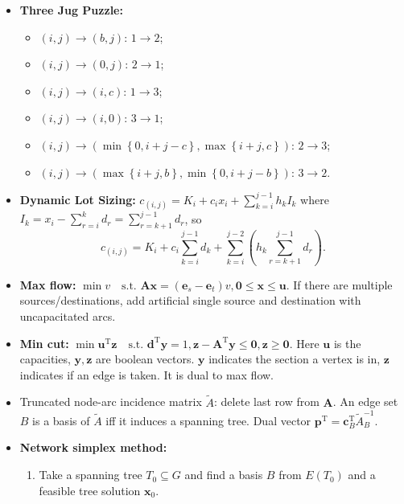 \documentclass[10pt]{article}
\begin{document}
\begin{multicols*}{3}
\begin{itemize}
            \item \textbf{Three Jug Puzzle: }
            \begin{itemize}
                \item $(i, j) \to (b, j)$: $1 \to 2$;
                \item $(i, j) \to (0, j)$: $2 \to 1$;
                \item $(i, j) \to (i, c)$: $1 \to 3$;
                \item $(i, j) \to (i, 0)$: $3 \to 1$;
                \item $(i, j) \to \left(\min\left\{0, i + j - c\right\}, \max\left\{i + j, c\right\}\right)$: $2 \to 3$;
                \item $(i, j) \to \left(\max\left\{i + j, b\right\}, \min\left\{0, i + j - b\right\}\right)$: $3 \to 2$.
            \end{itemize}
            \item \textbf{Dynamic Lot Sizing: } $c_{(i, j)} = K_i + c_ix_i + \sum_{k = i}^{j - 1}h_kI_k$ where $I_k = x_i - \sum_{r = i}^{k}d_r = \sum_{r = k + 1}^{j - 1}d_r$, so 
            \begin{equation*}
                c_{(i, j)} = K_i + c_i\sum_{k = i}^{j - 1}d_k + \sum_{k = i}^{j - 2}\left(h_k\sum_{r = k + 1}^{j - 1}d_r\right).
            \end{equation*}
            \item \textbf{Max flow:} $\min v \quad \textrm{s.t. } \bm{Ax} = (\bm{e}_s - \bm{e}_t)v, \mathbf{0} \leq \bm{x} \leq \bm{u}$. If there are multiple sources/destinations, add artificial single source and destination with uncapacitated arcs.
            \item \textbf{Min cut:} $\min\bm{u}^{\mathrm{T}}\bm{z} \quad \textrm{s.t. } \bm{d}^{\mathrm{T}}\bm{y} = 1, \bm{z} - \bm{A}^{\mathrm{T}}\bm{y}\leq \mathbf{0}, \bm{z} \geq \mathbf{0}$. Here $\bm{u}$ is the capacities, $\bm{y}, \bm{z}$ are boolean vectors. $\bm{y}$ indicates the section a vertex is in, $\bm{z}$ indicates if an edge is taken. It is dual to max flow.
            \item Truncated node-arc incidence matrix $\widetilde{A}$: delete last row from $\bm{A}$. An edge set $B$ is a basis of $\widetilde{A}$ iff it induces a spanning tree. Dual vector $\bm{p}^{\mathrm{T}} = \bm{c}^{\mathrm{T}}_B\widetilde{A}_B^{-1}$.
            \item \textbf{Network simplex method:}
            \begin{enumerate}
                \item Take a spanning tree $T_0 \subseteq G$ and find a basis $B$ from $E(T_0)$ and a feasible tree solution $\bm{x}_0$.

\end{enumerate}
\end{itemize}
\end{multicols*}
\end{document}
